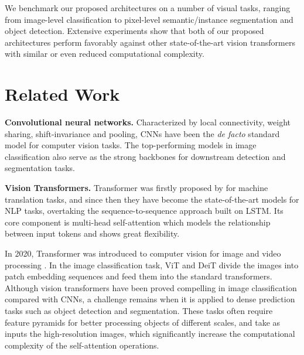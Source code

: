 \documentclass{article}
\begin{document}
We benchmark our proposed architectures on a number of visual tasks, ranging from image-level classification to pixel-level semantic/instance segmentation and object detection. Extensive experiments show that both of our proposed architectures perform favorably against other state-of-the-art vision transformers with similar or even reduced computational complexity.



\section{Related Work}
\textbf{Convolutional neural networks.} Characterized by local connectivity, weight sharing, shift-invariance and pooling, CNNs have been the \textit{de facto} standard 
model for computer vision tasks.
The top-performing models \cite{he2016deep,tan2019efficientnet,chollet2017xception,xie2017aggregated} in image classification also serve as the strong backbones for downstream detection and segmentation tasks. 

\textbf{Vision Transformers.} Transformer was firstly proposed by \cite{vaswani2017attention} for machine translation tasks, and since then they have become the state-of-the-art models for NLP tasks, overtaking the sequence-to-sequence approach built on LSTM. Its core component is multi-head self-attention which models the relationship between input tokens and shows great flexibility.

In 2020, 
Transformer was
introduced to computer vision for image and 
video processing
\cite{dosovitskiy2021an,touvron2020training,chu2021ConditionalPE,han2021transformer,ramachandran2019stand,xu2021coscale, wang2020end,
chen2020pre,
yang2020learning,zeng2020learning,dai2020up,Srinivas2021BottleneckTF,carion2020end,zheng2020rethinking,parmar2018image,touvron2021going,yuan2021tokens,jiang2021token,srinivas2021bottleneck,chen2021crossvit,wu2021cvt,xu2021coscale,zhu2021deformable}. In the image classification task, 
ViT \cite{dosovitskiy2021an} and DeiT \cite{touvron2020training}
 divide the images into patch embedding sequences and feed them into the standard transformers.
Although vision transformers have been proved compelling in image classification compared with CNNs, a
challenge 
remains when it is applied to dense prediction tasks such as object detection and segmentation. These tasks 
often 
require feature pyramids for better processing objects of different scales, and take as inputs the high-resolution images, which significantly increase the computational complexity of the self-attention operations.
\end{document}
